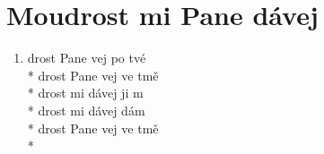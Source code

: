 \section{Moudrost mi Pane dávej}
\begin{enumerate}
\item {}drost Pane vej  po tvé   \\*
drost Pane vej  ve tmě  \\*
drost mi dávej  ji m \\*
drost mi dávej   dám \\*
drost Pane vej  ve tmě  \\*
\end{enumerate}
